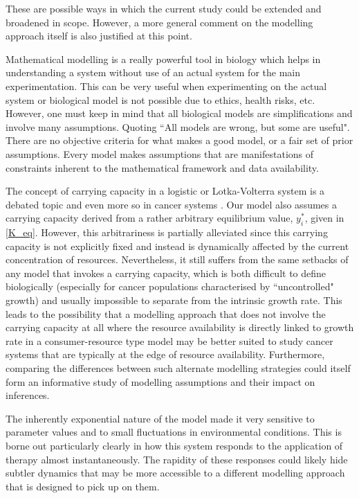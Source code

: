 These are possible ways in which the current study could be extended and broadened in scope. However, a more general comment on the modelling approach itself is also justified at this point.

Mathematical modelling is a really powerful tool in biology which helps in understanding a system without use of an actual system for the main experimentation. This can be very useful when experimenting on the actual system or biological model is not possible due to ethics, health risks, etc. However, one must keep in mind that all biological models are simplifications and involve many assumptions. Quoting \cite{Box} ``All models are wrong, but some are useful". There are no objective criteria for what makes a good model, or a fair set of prior assumptions. Every model makes assumptions that are manifestations of constraints inherent to the mathematical framework and data availability.

The concept of carrying capacity in a logistic or Lotka-Volterra system is a debated topic and even more so in cancer systems \cite{McLeod,Deisboeck}. Our model also assumes a carrying capacity derived from a rather arbitrary equilibrium value, $y_i^*$, given in \autoref{K_eq}. However, this arbitrariness is partially alleviated since this carrying capacity is not explicitly fixed and instead is dynamically affected by the current concentration of resources. Nevertheless, it still suffers from the same setbacks of any model that invokes a carrying capacity, which is both difficult to define biologically (especially for cancer populations characterised by ``uncontrolled" growth) and usually impossible to separate from the intrinsic growth rate. This leads to the possibility that a modelling approach that does not involve the carrying capacity at all where the resource availability is directly linked to growth rate in a consumer-resource type model may be better suited to study cancer systems that are typically at the edge of resource availability. Furthermore, comparing the differences between such alternate modelling strategies could itself form an informative study of modelling assumptions and their impact on inferences.

The inherently exponential nature of the model made it very sensitive to parameter values and to small fluctuations in environmental conditions. This is borne out particularly clearly in how this system responds to the application of therapy almost instantaneously. The rapidity of these responses could likely hide subtler dynamics that may be more accessible to a different modelling approach that is designed to pick up on them.

